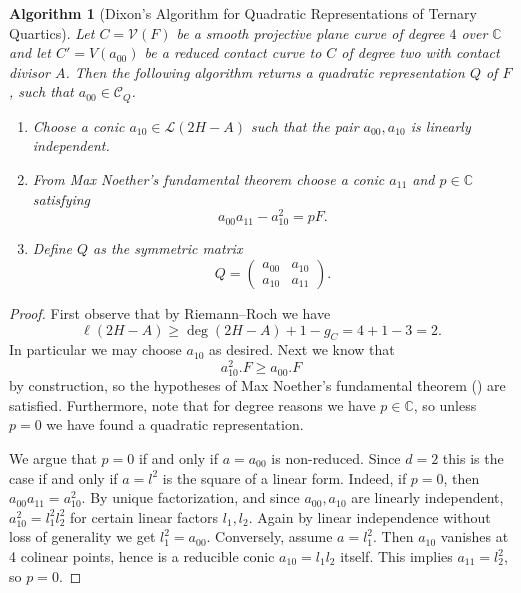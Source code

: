 \documentclass[a4paper,10pt]{amsart}
\theoremstyle{definition}
\theoremstyle{plain}
\newtheorem{alg}[Def]{Algorithm}
\newcommand{\cC}{{\mathcal C}}
\newcommand{\cL}{{\mathcal L}}
\newcommand{\cV}{{\mathcal V}}
\newcommand{\C}{{\mathbb C}}
\begin{document}
\begin{alg}[Dixon's Algorithm for Quadratic Representations of Ternary Quartics] \label{alg:Dixon}
Let $C = \cV(F)$ be a smooth projective plane curve of degree $4$ over $\C$ and let $C' = V(a_{00})$ be a reduced contact curve to $C$ of degree two with contact divisor $A$. Then the following algorithm returns a quadratic representation $Q$ of $F$, such that $a_{00} \in \cC_Q$.
\begin{enumerate}
    \item Choose a conic $a_{10} \in \cL(2H - A)$ such that the pair $a_{00}, a_{10}$ is linearly independent.
    \item From Max Noether's fundamental theorem choose a conic $a_{11}$ and $p \in \C$ satisfying
    \begin{equation*}
        a_{00}a_{11} - a_{10}^2 = pF.
    \end{equation*}
    \item Define $Q$ as the symmetric matrix
    \begin{equation*}
        Q = \begin{pmatrix}
            a_{00} & a_{10} \\
            a_{10} & a_{11}
        \end{pmatrix}.
    \end{equation*}
\end{enumerate}
\end{alg}

\begin{proof}
First observe that by Riemann--Roch we have
\begin{equation*}
    \ell(2H - A) \geq \deg(2H - A) + 1 - g_C = 4 + 1 - 3 = 2.
\end{equation*}
In particular we may choose $a_{10}$ as desired. Next we know that
\begin{equation*}
    a_{10}^2.F \geq a_{00}.F
\end{equation*}
by construction, so the hypotheses of Max Noether's fundamental theorem () are satisfied. Furthermore, note that for degree reasons we have $p \in \C$, so unless $p = 0$ we have found a quadratic representation.

We argue that $p = 0$ if and only if $a = a_{00}$ is non-reduced. Since $d = 2$ this is the case if and only if $a = l^2$ is the square of a linear form. Indeed, if $p = 0$, then $a_{00}a_{11} = a_{10}^2$. By unique factorization, and since $a_{00},a_{10}$ are linearly independent, $a_{10}^2 = l_1^2l_2^2$ for certain linear factors $l_1,l_2$. Again by linear independence without loss of generality we get $l_1^2 = a_{00}$. Conversely, assume $a = l_1^2$. Then $a_{10}$ vanishes at 4 colinear points, hence is a reducible conic $a_{10} = l_1l_2$ itself. This implies $a_{11} = l_2^2$, so $p = 0$.
\end{proof}
\end{document}
